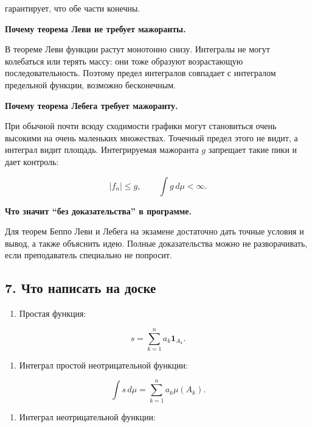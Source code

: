 \documentclass[
  11pt,
  a4paper,
]{article}
\providecommand{\tightlist}{%
  \setlength{\itemsep}{0pt}\setlength{\parskip}{0pt}}
\begin{document}
гарантирует, что обе части конечны.

\textbf{Почему теорема Леви не требует мажоранты.}

В теореме Леви функции растут монотонно снизу. Интегралы не могут
колебаться или терять массу: они тоже образуют возрастающую
последовательность. Поэтому предел интегралов совпадает с интегралом
предельной функции, возможно бесконечным.

\textbf{Почему теорема Лебега требует мажоранту.}

При обычной почти всюду сходимости графики могут становиться очень
высокими на очень маленьких множествах. Точечный предел этого не видит,
а интеграл видит площадь. Интегрируемая мажоранта \(g\) запрещает такие
пики и дает контроль:

\[
|f_n|\le g,\qquad \int g\,d\mu<\infty.
\]

\textbf{Что значит ``без доказательства'' в программе.}

Для теорем Беппо Леви и Лебега на экзамене достаточно дать точные
условия и вывод, а также объяснить идею. Полные доказательства можно не
разворачивать, если преподаватель специально не попросит.

\subsection{7. Что написать на
доске}\label{ux447ux442ux43e-ux43dux430ux43fux438ux441ux430ux442ux44c-ux43dux430-ux434ux43eux441ux43aux435}

\begin{enumerate}
\def\labelenumi{\arabic{enumi}.}
\tightlist
\item
  Простая функция:
\end{enumerate}

\[
s=\sum_{k=1}^n a_k\mathbf 1_{A_k}.
\]

\begin{enumerate}
\def\labelenumi{\arabic{enumi}.}
\setcounter{enumi}{1}
\tightlist
\item
  Интеграл простой неотрицательной функции:
\end{enumerate}

\[
\int s\,d\mu=\sum_{k=1}^n a_k\mu(A_k).
\]

\begin{enumerate}
\def\labelenumi{\arabic{enumi}.}
\setcounter{enumi}{2}
\tightlist
\item
  Интеграл неотрицательной функции:
\end{enumerate}
\end{document}
